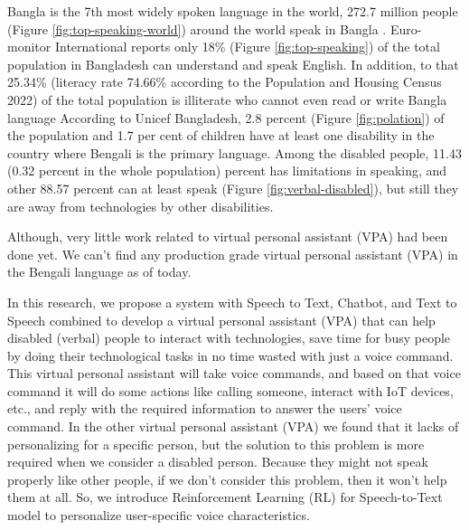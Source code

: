 Bangla is the 7th most widely spoken language in the world, 272.7 million people (Figure \ref{fig:top-speaking-world}) around the world speak in Bangla \cite{mostspoken}.
Euro-monitor International reports only 18\% (Figure \ref{fig:top-speaking}) of the total population in Bangladesh can understand and speak English\cite{english-speaker-bangladesh}.
In addition, to that 25.34\% (literacy rate 74.66\% according to the Population and Housing Census 2022) of the total population is illiterate who cannot even read or write Bangla language\cite{litaracy-bangladesh}
According to Unicef Bangladesh, 2.8 percent (Figure \ref{fig:polation}) of the population and 1.7 per cent of children have at least one disability\cite{disabled-stats} in the country where Bengali is the primary language.
Among the disabled people, 11.43 (0.32 percent in the whole population) percent has limitations in speaking, and other 88.57 percent can at least speak (Figure \ref{fig:verbal-disabled}), but still they are away from technologies by other disabilities.

Although, very little work related to virtual personal assistant (VPA) had been done yet\cite{adheetee}.
We can't find any production grade virtual personal assistant (VPA) in the Bengali language as of today.

In this research, we propose a system with Speech to Text, Chatbot, and Text to Speech combined to develop a virtual personal assistant (VPA) that can help disabled (verbal) people to interact with technologies, save time for busy people by doing their technological tasks in no time wasted with just a voice command.
This virtual personal assistant will take voice commands, and based on that voice command it will do some actions like calling someone, interact with IoT devices, etc., and reply with the required information to answer the users' voice command.
In the other virtual personal assistant (VPA) we found that it lacks of personalizing for a specific person, but the solution to this problem is more required when we consider a disabled person.
Because they might not speak properly like other people, if we don't consider this problem, then it won't help them at all.
So, we introduce Reinforcement Learning (RL) for Speech-to-Text model to personalize user-specific voice characteristics.

